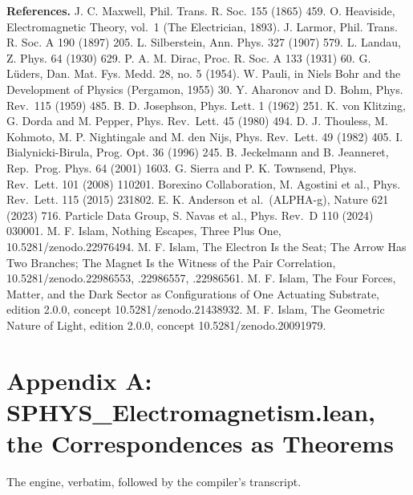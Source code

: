 \documentclass[10pt]{article}
\begin{document}
\textbf{References.} J. C. Maxwell, Phil. Trans. R. Soc. 155 (1865) 459.
O. Heaviside, Electromagnetic Theory, vol.~1 (The Electrician, 1893). J.
Larmor, Phil. Trans. R. Soc. A 190 (1897) 205. L. Silberstein, Ann.
Phys. 327 (1907) 579. L. Landau, Z. Phys. 64 (1930) 629. P. A. M. Dirac,
Proc. R. Soc. A 133 (1931) 60. G. Lüders, Dan. Mat. Fys. Medd. 28, no. 5
(1954). W. Pauli, in Niels Bohr and the Development of Physics
(Pergamon, 1955) 30. Y. Aharonov and D. Bohm, Phys. Rev.~115 (1959) 485.
B. D. Josephson, Phys. Lett. 1 (1962) 251. K. von Klitzing, G. Dorda and
M. Pepper, Phys. Rev.~Lett. 45 (1980) 494. D. J. Thouless, M. Kohmoto,
M. P. Nightingale and M. den Nijs, Phys. Rev.~Lett. 49 (1982) 405. I.
Bialynicki-Birula, Prog. Opt. 36 (1996) 245. B. Jeckelmann and B.
Jeanneret, Rep.~Prog. Phys. 64 (2001) 1603. G. Sierra and P. K.
Townsend, Phys. Rev.~Lett. 101 (2008) 110201. Borexino Collaboration, M.
Agostini et al., Phys. Rev.~Lett. 115 (2015) 231802. E. K. Anderson et
al.~(ALPHA-g), Nature 621 (2023) 716. Particle Data Group, S. Navas et
al., Phys. Rev.~D 110 (2024) 030001. M. F. Islam, Nothing Escapes, Three
Plus One, 10.5281/\allowbreak{}zenodo.22976494. M. F. Islam, The
Electron Is the Seat; The Arrow Has Two Branches; The Magnet Is the
Witness of the Pair Correlation, 10.5281/\allowbreak{}zenodo.22986553,
.22986557, .22986561. M. F. Islam, The Four Forces, Matter, and the Dark
Sector as Configurations of One Actuating Substrate, edition 2.0.0,
concept 10.5281/\allowbreak{}zenodo.21438932. M. F. Islam, The Geometric
Nature of Light, edition 2.0.0, concept
10.5281/\allowbreak{}zenodo.20091979.

\hypertarget{appendix-a-sphys_electromagnetism.lean-the-correspondences-as-theorems}{%
\section{Appendix A: SPHYS\_Electromagnetism.lean, the Correspondences
as
Theorems}\label{appendix-a-sphys_electromagnetism.lean-the-correspondences-as-theorems}}

The engine, verbatim, followed by the compiler's transcript.
\end{document}
